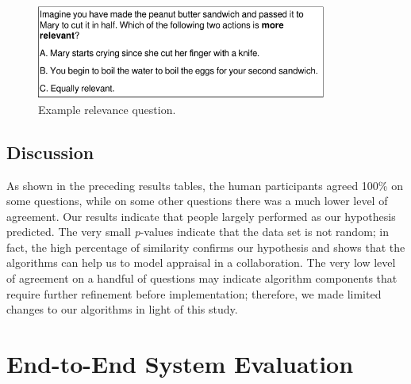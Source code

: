 \documentclass[12pt]{report}
\begin{document}
\begin{figure}[t]
  \centering
  \includegraphics[width=0.85\textwidth]{figure/question-sample4-croped.pdf}
  \caption{{Example relevance question.}}
  \label{fig:qs4}
\end{figure}

\subsection{Discussion}
\label{sec:discussion-crowdsourcing}
As shown in the preceding results tables, the human participants agreed 100\%
on some questions, while on some other questions there was a much lower level of
agreement. Our results indicate that people largely performed as our hypothesis
predicted. The very small \textit{p}-values indicate that the data set is not
random; in fact, the high percentage of similarity confirms our hypothesis and
shows that the algorithms can help us to model appraisal in a collaboration. The
very low level of agreement on a handful of questions may indicate algorithm
components that require further refinement before implementation; therefore, we
made limited changes to our algorithms in light of this study.



\section{End-to-End System Evaluation}
\label{sec:end-to-end}
\end{document}
